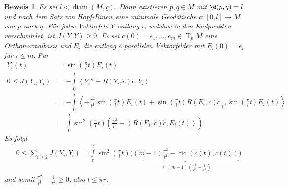 \documentclass[paper=A4, twoside, chapterprefix=true, bibliography=totoc, headsepline]{scrbook}
\DeclareMathOperator{\diam}{diam}   %
\DeclareMathOperator{\ric}{ric}     %
\DeclareMathOperator{\T}{T}         %
\theoremstyle{plain}
\theoremstyle{nonumberplain}
\newtheorem{bew}{Beweis}
\theoremstyle{empty}
\theoremstyle{break}
\begin{document}
\begin{bew}
  Es sei $l < \diam(M,g)$.
  Dann existieren $p,q \in M$ mit $\d(p,q) = l$ und nach dem Satz von Hopf-Rinow eine minimale Geod\"atische $c\colon[0,l] \to M$ von $p$ nach $q$.
  F\"ur jedes Vektorfeld $Y$ entlang $c$, welches in den Endpunkten verschwindet, ist $J(Y,Y) \geq 0$.
  Es sei $\dot c(0) = e_1, \ldots, e_m \in \T_pM$ eine Orthonormalbasis und $E_i$ die entlang $c$ parallelen Vektorfelder mit $E_i(0) = e_i$ f\"ur $i \leq m$.
  F\"ur 
  \begin{align*}
    Y_i(t) & = \sin \left(\frac{\pi}{l}t \right) E_i(t)\\
    0  \leq J(Y_i,Y_i) &= -\int\limits_0^l\left<Y_i''+R(Y_i,\dot c)\dot c,Y_i\right>\\
    & = -\int\limits_0^l\left<-\frac{\pi^2}{l^2}\sin\left(\frac{\pi}{l}t\right)E_i(t) + \sin\left(\frac{\pi}{l}t\right)R(E_i,\dot c)\dot c|_t,\sin\left(\frac{\pi}{l}t\right)E_i(t)\right>\\
    & = \int\limits_0^l \sin^2\left(\frac{\pi}{l}t\right)\left(\frac{\pi^2}{l^2}-\left<R(E_i,\dot c)\dot c,E_i(t)\right>\right).
  \end{align*}
  Es folgt
  \begin{align*}
    0 \leq \sum_{i \geq 2}J(Y_i,Y_i) = \int\limits_0^l\sin^2\left(\frac{\pi}{l}t\right)\Big(\underbrace{(m-1)\frac{\pi^2}{l^2} - \ric(\dot c(t),\dot c(t))}_{\leq (m-1)\left(\frac{\pi^2}{l^2}-\frac{1}{r^2}\right)}\Big)
  \end{align*}
  und somit $\frac{\pi^2}{l^2} - \frac{1}{r^2} \geq 0$, also $l \leq \pi r$.
\end{bew}
\end{document}
